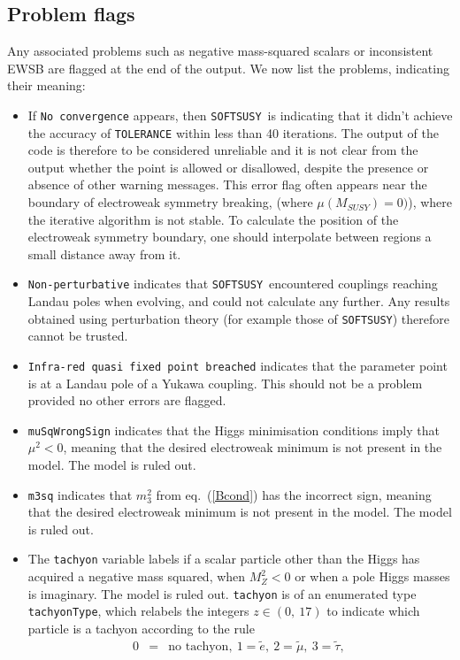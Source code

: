 \documentclass[]{article}
\def\SOFTSUSY{{\tt SOFTSUSY}}
\def\code#1{\small{\tt #1}\normalsize}
\begin{document}
\subsection{Problem flags \label{sec:prob}}
Any associated problems such as negative mass-squared scalars
or 
inconsistent EWSB are flagged at the end of the output.
We now list the problems, indicating their meaning:
\begin{itemize}
\item
If \code{No convergence} appears, then \SOFTSUSY~is indicating that 
it didn't achieve the accuracy of \code{TOLERANCE} within less than 40
iterations. The output of the code is therefore to be considered unreliable
and it is not clear from the output whether the point is allowed or
disallowed, despite the presence or absence of other warning messages. 
This error flag often appears near the boundary of electroweak symmetry
breaking, (where $\mu(M_{SUSY})=0)$), where the iterative algorithm is not
stable. To 
calculate the position of the electroweak symmetry boundary, one should
interpolate between regions a small distance away from it. 
\item
\code{Non-perturbative}
indicates that \SOFTSUSY~encountered couplings reaching 
Landau poles when 
evolving, and could not calculate any further. Any results obtained using
perturbation theory (for example those of \code{SOFTSUSY})
therefore cannot be trusted.
\item
\code{Infra-red quasi fixed point breached} indicates that the parameter point
is at a Landau  pole of a Yukawa coupling. This should not be a problem
provided no other errors are flagged.
\item
\code{muSqWrongSign} indicates that the Higgs minimisation conditions imply
that $\mu^2<0$, meaning that the desired electroweak minimum is not present in
the model. The model is ruled out.
\item
\code{m3sq} indicates that $m_3^2$ from eq.~(\ref{Bcond}) has the incorrect
sign, meaning that the desired electroweak minimum is not present in
the model. The model is ruled out.
\item
The \code{tachyon} variable labels if a scalar particle other than the Higgs
has acquired a negative mass squared, when $M_Z^2<0$ or when 
a pole Higgs masses is imaginary. The model is ruled out.
\code{tachyon} is of an enumerated type \code{tachyonType}, which relabels the
integers $z \in (0,\ 17)$ to indicate which particle is a tachyon according to
the rule
\begin{eqnarray}
0&=&\mbox{no tachyon},\ 1=\tilde e,\ 2=\tilde \mu,\ 3=\tilde \tau,\ 

\end{eqnarray}
\end{itemize}
\end{document}
